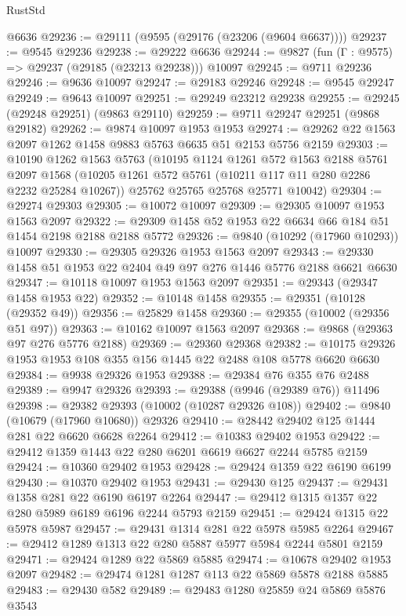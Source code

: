 \begin{lexlean}{RustStd}
\begin{coremodule}
    @6636
@29236 := @29111 (@9595 (@29176 (@23206 (@9604 @6637))))
@29237 := @9545 @29236
@29238 := @29222 @6636
@29244 := @9827 (fun (Γ : @9575) => @29237 (@29185 (@23213 @29238))) @10097
@29245 := @9711 @29236
@29246 := @9636 @10097
@29247 := @29183 @29246
@29248 := @9545 @29247
@29249 := @9643 @10097
@29251 := @29249 @23212 @29238
@29255 := @29245 (@29248 @29251) (@9863 @29110)
@29259 := @9711 @29247 @29251 (@9868 @29182)
@29262 := @9874 @10097 @1953 @1953
@29274 := @29262 @22 @1563 @2097 @1262 @1458 @9883 @5763 @6635 @51 @2153 @5756 @2159
@29303 := @10190
    @1262
    @1563
    @5763
    (@10195
      @1124
      @1261
      @572
      @1563
      @2188
      @5761
      @2097
      @1568
      (@10205 @1261 @572 @5761 (@10211 @117 @11 @280 @2286 @2232 @25284 @10267))
      @25762
      @25765
      @25768
      @25771
      @10042)
@29304 := @29274 @29303
@29305 := @10072 @10097
@29309 := @29305 @10097 @1953 @1563 @2097
@29322 := @29309 @1458 @52 @1953 @22 @6634 @66 @184 @51 @1454 @2198 @2188 @2188 @5772
@29326 := @9840 (@10292 (@17960 @10293)) @10097
@29330 := @29305 @29326 @1953 @1563 @2097
@29343 := @29330 @1458 @51 @1953 @22 @2404 @49 @97 @276 @1446 @5776 @2188 @6621 @6630
@29347 := @10118 @10097 @1953 @1563 @2097
@29351 := @29343 (@29347 @1458 @1953 @22)
@29352 := @10148 @1458
@29355 := @29351 (@10128 (@29352 @49))
@29356 := @25829 @1458
@29360 := @29355 (@10002 (@29356 @51 @97))
@29363 := @10162 @10097 @1563 @2097
@29368 := @9868 (@29363 @97 @276 @5776 @2188)
@29369 := @29360 @29368
@29382 := @10175 @29326 @1953 @1953 @108 @355 @156 @1445 @22 @2488 @108 @5778 @6620 @6630
@29384 := @9938 @29326 @1953
@29388 := @29384 @76 @355 @76 @2488
@29389 := @9947 @29326
@29393 := @29388 (@9946 (@29389 @76)) @11496
@29398 := @29382 @29393 (@10002 (@10287 @29326 @108))
@29402 := @9840 (@10679 (@17960 @10680)) @29326
@29410 := @28442 @29402 @125 @1444 @281 @22 @6620 @6628 @2264
@29412 := @10383 @29402 @1953
@29422 := @29412 @1359 @1443 @22 @280 @6201 @6619 @6627 @2244 @5785 @2159
@29424 := @10360 @29402 @1953
@29428 := @29424 @1359 @22 @6190 @6199
@29430 := @10370 @29402 @1953
@29431 := @29430 @125
@29437 := @29431 @1358 @281 @22 @6190 @6197 @2264
@29447 := @29412 @1315 @1357 @22 @280 @5989 @6189 @6196 @2244 @5793 @2159
@29451 := @29424 @1315 @22 @5978 @5987
@29457 := @29431 @1314 @281 @22 @5978 @5985 @2264
@29467 := @29412 @1289 @1313 @22 @280 @5887 @5977 @5984 @2244 @5801 @2159
@29471 := @29424 @1289 @22 @5869 @5885
@29474 := @10678 @29402 @1953 @2097
@29482 := @29474 @1281 @1287 @113 @22 @5869 @5878 @2188 @5885
@29483 := @29430 @582
@29489 := @29483 @1280 @25859 @24 @5869 @5876 @3543

\end{coremodule}
\end{lexlean}
